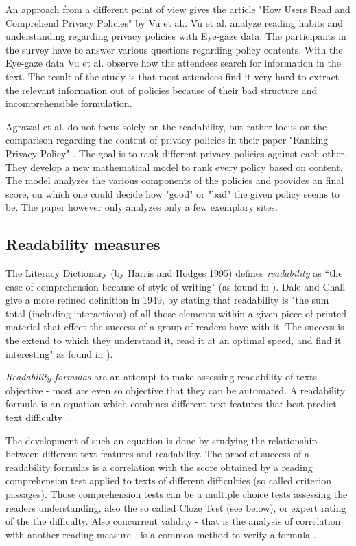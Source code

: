 \documentclass[runningheads,a4paper]{llncs}
\begin{document}
An approach from a different point of view gives the article "How Users Read and Comprehend Privacy Policies" by Vu et al.\cite{Vu2007}. Vu et al. analyze reading habits and understanding regarding privacy policies with Eye-gaze data. The participants in the survey have to answer various questions regarding policy contents. With the Eye-gaze data Vu et al. observe how the attendees search for information in the text. The result of the study is that most attendees find it very hard to extract the relevant information out of policies because of their bad structure and incomprehensible formulation.

Agrawal et al. do not focus solely on the readability, but rather focus on the comparison regarding the content of privacy policies in their paper "Ranking Privacy Policy" \cite{Agrawal2007}. The goal is to rank different privacy policies against each other. They develop a new mathematical model to rank every policy based on content. The model analyzes the various components of the policies and provides an final score, on which one could decide how "good" or "bad" the given policy seems to be. The paper however only analyzes only a few exemplary sites.

\subsection{Readability measures} \label{sec:readability_measures}

The Literacy Dictionary (by Harris and Hodges 1995) defines \emph{readability} as “the ease of comprehension because of style of writing" (as found in \cite{Fry2006}). Dale and Chall give a more refined definition in 1949, by stating that readability is "the sum total (including interactions) of all those elements within a given piece of printed material that effect the success of a group of readers have with it. The success is the extend to which they understand it, read it at an optimal speed, and find it interesting" as found in \cite{Chall1995}).

\emph{Readability formulas} are an attempt to make assessing readability of texts objective - most are even so objective that they can be automated. A readability formula is an equation which combines different text features that best predict text difficulty \cite{Chall1995}. 

The development of such an equation is done by studying the relationship between different text features and readability. The proof of success of a readability formulas is a correlation with the score obtained by a reading comprehension test applied to texts of different difficulties (so called criterion passages). Those comprehension tests can be a multiple choice tests assessing the readers understanding, also the so called Cloze Test (see below), or expert rating of the the difficulty. Also concurrent validity - that is the analysis of correlation with another reading measure - is a common method to verify a formula \cite{Fry2006}.
\end{document}
